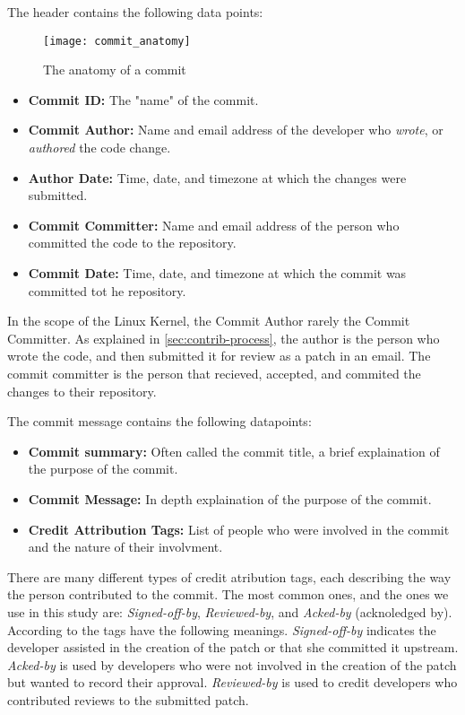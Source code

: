 The header contains the following data points:

\begin{figure}[htb]
\centering
\texttt{[image: commit\_anatomy]}
\caption{The anatomy of a commit}
\label{fig:commit_anatomy}
\end{figure}

\begin{itemize}
	\item \textbf{Commit ID:} The "name" of the commit.
	\item \textbf{Commit Author:} Name and email address of the developer who \textit{wrote}, or \textit{authored} the code change.
	\item \textbf{Author Date:} Time, date, and timezone at which the changes were submitted.
	\item \textbf{Commit Committer:} Name and email address of the person who committed the code to the repository.
	\item \textbf{Commit Date:} Time, date, and timezone at which the commit was committed tot he repository.
\end{itemize}

In the scope of the Linux Kernel, the Commit Author rarely the Commit Committer. As explained in \autoref{sec:contrib-process}, the author is the person who wrote the code, and then submitted it for review as a patch in an email. The commit committer is the person that recieved, accepted, and commited the changes to their repository.

The commit message contains the following datapoints:

\begin{itemize}
	\item \textbf{Commit summary:} Often called the commit title, a brief explaination of the purpose of the commit. 
	\item \textbf{Commit Message:} In depth explaination of the purpose of the commit.
	\item \textbf{Credit Attribution Tags:} List of people who were involved in the commit and the nature of their involvment. 
\end{itemize}

There are many different types of credit atribution tags, each describing the way the person contributed to the commit. The most common ones, and the ones we use in this study are: \textit{Signed-off-by}, \textit{Reviewed-by}, and \textit{Acked-by} (acknoledged by). According to  the tags have the following meanings. \textit{Signed-off-by} indicates the developer assisted in the creation of the patch or that she committed it upstream. \textit{Acked-by} is used by developers who were not involved in the creation of the patch but wanted to record their approval. \textit{Reviewed-by} is used to credit developers who contributed reviews to the submitted patch. 

